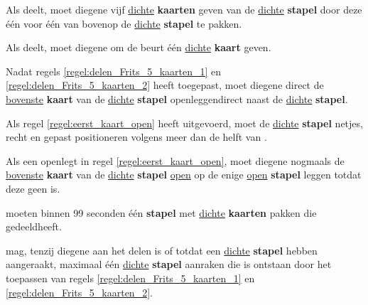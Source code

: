 \vervolgLijst{}
\item Als \Frits deelt\footnotemark[1], moet diegene \alleSpelers vijf \ul{dichte} \textbf{kaarten} geven van de \ul{dichte} \textbf{stapel} door deze één voor één van bovenop de \ul{dichte} \textbf{stapel} te pakken.
\label{regel:delen_Frits_5_kaarten_1}
\eindLijst{}

\vervolgLijst{}
\item Als \Frits deelt\footnotemark[1], moet diegene \alleSpelers om de beurt één \ul{dichte} \textbf{kaart} geven.
\label{regel:delen_Frits_5_kaarten_2}
\eindLijst{}

\vervolgLijst{}
\item Nadat \Frits regels \ref{regel:delen_Frits_5_kaarten_1} en \ref{regel:delen_Frits_5_kaarten_2} heeft toegepast, moet diegene direct de \ul{bovenste} \textbf{kaart} van de \ul{dichte} \textbf{stapel} openleggen\footnotemark[2] direct naast de \ul{dichte} \textbf{stapel}.
\label{regel:eerst_kaart_open}
\eindLijst{}

\vervolgLijst{}
\item Als \Frits regel \ref{regel:eerst_kaart_open} heeft uitgevoerd, moet \Frits de \ul{dichte} \textbf{stapel} netjes, recht en gepast positioneren volgens meer dan de helft van \alleSpelersN.
\label{regel:dichte_stapel_recht_na_eerste_keer_opleggen}
\eindLijst{}


\vervolgLijst{}
\item Als \Frits een \footnotemark[3] openlegt in regel \ref{regel:eerst_kaart_open}, moet diegene nogmaals de \ul{bovenste} \textbf{kaart} van de \ul{dichte} \textbf{stapel} \ul{open} op de enige \ul{open} \textbf{stapel} leggen totdat deze geen \footnotemark[3] is.
\label{regel:eerste_kaart_open_joker}
\eindLijst{}


\vervolgLijst{}
\item \AlleSpelers moeten binnen 99 seconden \'e\'en \textbf{stapel} met \ul{dichte} \textbf{kaarten} pakken die \Frits gedeeld\footnotemark[1] heeft.
\label{regel:andere_kaarten_pakken}
\eindLijst{}

\vervolgLijst{}
\item \EenSpeler mag, tenzij diegene aan het delen is of totdat \alleSpelers een \ul{dichte} \textbf{stapel} hebben aangeraakt, maximaal \'e\'en \ul{dichte} \textbf{stapel} aanraken die is ontstaan door het toepassen van regels \ref{regel:delen_Frits_5_kaarten_1} en \ref{regel:delen_Frits_5_kaarten_2}.
\label{regel:andere_kaarten_pakken_2}
\eindLijst{}

